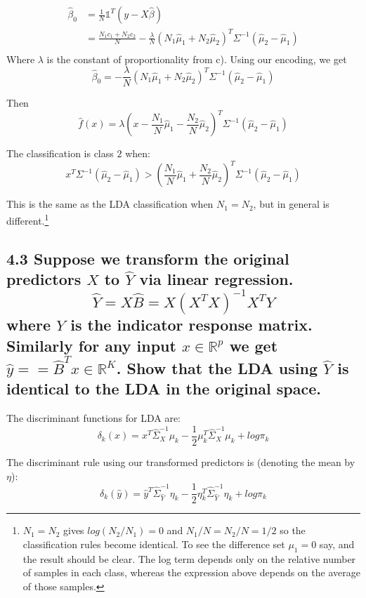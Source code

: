 \begin{align*}
    \hat{\beta}_0 &= \frac{1}{N}\mathbb{1}^T\left(y - X\hat{\beta}\right)\\
    &= \frac{N_1 c_1 + N_2 c_2}{N} - \frac{\lambda}{N} \left(N_1 \hat{\mu}_1 + N_2 \hat{\mu}_2\right)^T \Sigma^{-1} \left(\hat{\mu}_2 - \hat{\mu}_1 \right)\\
\end{align*}
Where $\lambda$ is the constant of proportionality from c).
Using our encoding, we get 
$$\hat{\beta}_0 =  - \frac{\lambda}{N} \left(N_1 \hat{\mu}_1 + N_2 \hat{\mu}_2\right)^T \Sigma^{-1} \left(\hat{\mu}_2 - \hat{\mu}_1 \right)$$

Then $$\hat{f}(x) = \lambda \left(x -\frac{N_1}{N} \hat{\mu}_1 - \frac{N_2}{N} \hat{\mu}_2\right)^T \Sigma^{-1} \left(\hat{\mu}_2 - \hat{\mu}_1 \right)$$

The classification is class $2$ when:
$$x^T \Sigma^{-1} \left(\hat{\mu}_2 - \hat{\mu}_1 \right) > \left(\frac{N_1}{N} \hat{\mu}_1 + \frac{N_2}{N} \hat{\mu}_2\right)^T \Sigma^{-1} \left(\hat{\mu}_2 - \hat{\mu}_1 \right)$$

This is the same as the LDA classification when $N_1 = N_2$, but in general is different.\footnote{
$N_1 = N_2$ gives $log (N_2 / N_1) = 0$ and $N_1 / N = N_2 / N = 1/2$ so the classification rules become identical. To see the difference set $\mu_1 = 0$ say, and the result should be clear. The log term depends only on the relative number of samples in each class, whereas the expression above depends on the average of those samples.}

\subsection*{4.3 Suppose we transform the original predictors $X$ to $\hat{Y}$ via linear regression.
$$\hat{Y} = X\hat{B} = X(X^T X)^{-1} X^T Y$$
where $Y$ is the indicator response matrix. Similarly for any input $x \in \mathbb{R}^p$ we get
$\hat{y} = = \hat{B}^T x \in \mathbb{R}^K$. Show that the LDA using $\hat{Y}$ is identical to the LDA in the original space.}

The discriminant functions for LDA are:
$$\delta_k(x) = x^T \hat{\Sigma}_X^{-1} \mu_k - \frac{1}{2} \mu_k^T \hat{\Sigma}_X^{-1}\mu_k + log \pi_k$$

The discriminant rule using our transformed predictors is (denoting the mean by $\eta$):
$$\delta_k(\hat{y}) = \hat{y}^T \hat{\Sigma}_{\hat{Y}}^{-1} \eta_k - \frac{1}{2} \eta_k^T \hat{\Sigma}_{\hat{Y}}^{-1}\eta_k + log \pi_k$$


